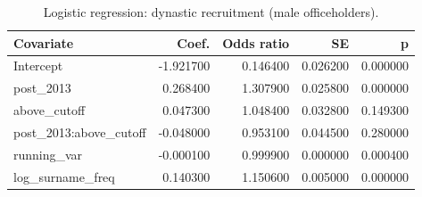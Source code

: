 \begin{table}[htbp]
\centering
\begin{tabular}{lrrrr}
\toprule
Covariate & Coef. & Odds ratio & SE & p \\
\midrule
Intercept & -1.921700 & 0.146400 & 0.026200 & 0.000000 \\
post_2013 & 0.268400 & 1.307900 & 0.025800 & 0.000000 \\
above_cutoff & 0.047300 & 1.048400 & 0.032800 & 0.149300 \\
post_2013:above_cutoff & -0.048000 & 0.953100 & 0.044500 & 0.280000 \\
running_var & -0.000100 & 0.999900 & 0.000000 & 0.000400 \\
log_surname_freq & 0.140300 & 1.150600 & 0.005000 & 0.000000 \\
\bottomrule
\end{tabular}

\caption{Logistic regression: dynastic recruitment (male officeholders).}
\label{tab:dynasty}
\end{table}
